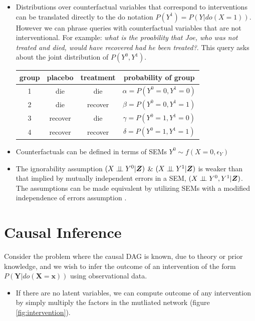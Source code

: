 \documentclass[a0,landscape,25pt,plainsections]{sciposter}
\begin{document}
\begin{multicols}{5}
\begin{itemize}
\item Distributions over counterfactual variables that correspond to interventions can be translated directly to the do notation $P(Y^{1}) = P(Y|do(X=1))$. However we can phrase queries with counterfactual variables that are not interventional. For example: \textit{what is the proability that Joe, who was not treated and died, would have recovered had he been treated?}. This query asks about the joint distribution of $P(Y^{0},Y^{1})$. 

\begin{center}
\begin{tabular}{c|c|c|c}
group & placebo & treatment & probability of group\\
\hline
1 & die & die & $\alpha=P(Y^{0}=0,Y^{1}=0)$\\
2 & die & recover & $\beta=P(Y^{0}=0,Y^{1}=1)$\\
3 & recover & die & $\gamma=P(Y^{0}=1,Y^{1}=0)$\\
4 & recover & recover & $\delta=P(Y^{0}=1,Y^{1}=1)$\\
\end{tabular}
\end{center}

\item Counterfactuals can be defined in terms of SEMs $Y^0 \sim f(X=0,\epsilon_Y)$ 
\item The ignorability assumption $(X \perp\!\!\!\perp Y^{0}|\boldsymbol{Z})$ \&  $(X\perp\!\!\!\perp Y^{1}|\boldsymbol{Z})$ is weaker than that implied by mutually independent errors in a SEM, $(X \perp\!\!\!\perp Y^0,Y^1 | \boldsymbol{Z})$. The assumptions can be made equivalent by utilizing SEMs with a modified independence of errors assumption \cite{Richardson2013}. 

\end{itemize}



\section*{Causal Inference}

Consider the problem where the causal DAG is known, due to theory or prior knowledge, and we wish to infer the outcome of an intervention of the form $P(\boldsymbol{Y}|do(\boldsymbol{X}=\boldsymbol{x}))$ using observational data.

\begin{itemize}
\item If there are no latent variables, we can compute outcome of any intervention by simply multiply the factors in the mutliated network (figure \ref{fig:intervention}).
\end{itemize}




\end{multicols}
\end{document}
